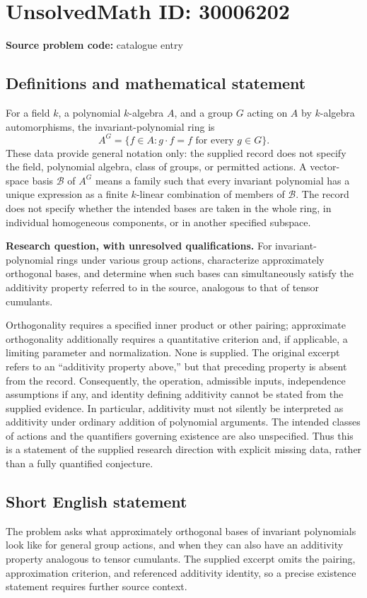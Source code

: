 \documentclass[11pt]{article}
\begin{document}
\section*{UnsolvedMath ID: 30006202}
\textbf{Source problem code:} catalogue entry
\subsection{Definitions and mathematical statement}
For a field \(k\), a polynomial \(k\)-algebra \(A\), and a group \(G\) acting on \(A\) by \(k\)-algebra automorphisms, the invariant-polynomial ring is
\[
A^G=\{f\in A: g\cdot f=f\text{ for every }g\in G\}.
\]
These data provide general notation only: the supplied record does not specify the field, polynomial algebra, class of groups, or permitted actions. A vector-space basis \(\mathcal B\) of \(A^G\) means a family such that every invariant polynomial has a unique expression as a finite \(k\)-linear combination of members of \(\mathcal B\). The record does not specify whether the intended bases are taken in the whole ring, in individual homogeneous components, or in another specified subspace.

\textbf{Research question, with unresolved qualifications.} For invariant-polynomial rings under various group actions, characterize approximately orthogonal bases, and determine when such bases can simultaneously satisfy the additivity property referred to in the source, analogous to that of tensor cumulants.

Orthogonality requires a specified inner product or other pairing; approximate orthogonality additionally requires a quantitative criterion and, if applicable, a limiting parameter and normalization. None is supplied. The original excerpt refers to an ``additivity property above,'' but that preceding property is absent from the record. Consequently, the operation, admissible inputs, independence assumptions if any, and identity defining additivity cannot be stated from the supplied evidence. In particular, additivity must not silently be interpreted as additivity under ordinary addition of polynomial arguments. The intended classes of actions and the quantifiers governing existence are also unspecified. Thus this is a statement of the supplied research direction with explicit missing data, rather than a fully quantified conjecture.
\subsection{Short English statement}
The problem asks what approximately orthogonal bases of invariant polynomials look like for general group actions, and when they can also have an additivity property analogous to tensor cumulants. The supplied excerpt omits the pairing, approximation criterion, and referenced additivity identity, so a precise existence statement requires further source context.
\end{document}
